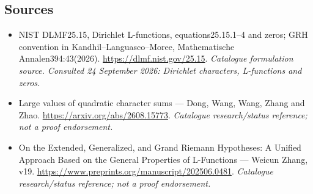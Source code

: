 \documentclass[11pt,a4paper]{article}
\begin{document}
\subsection{Sources}
\begin{itemize}\raggedright
\item[\textnormal{[S1]}]\hypertarget{source:statement:1}{} NIST DLMF25.15, Dirichlet L-functions, equations25.15.1–4 and zeros; GRH convention in Kandhil–Languasco–Moree, Mathematische Annalen394:43(2026).
\url{https://dlmf.nist.gov/25.15}.
{\small\textit{Catalogue formulation source. Consulted 24 September 2026: Dirichlet characters, L-functions and zeros.}}
\item[\textnormal{[S2]}]\hypertarget{source:statement:2}{} Large values of quadratic character sums — Dong, Wang, Wang, Zhang and Zhao.
\url{https://arxiv.org/abs/2608.15773}.
{\small\textit{Catalogue research/status reference; not a proof endorsement.}}
\item[\textnormal{[S3]}]\hypertarget{source:statement:3}{} On the Extended, Generalized, and Grand Riemann Hypotheses: A Unified Approach Based on the General Properties of L-Functions — Weicun Zhang, v19.
\url{https://www.preprints.org/manuscript/202506.0481}.
{\small\textit{Catalogue research/status reference; not a proof endorsement.}}
\end{itemize}

\end{document}
